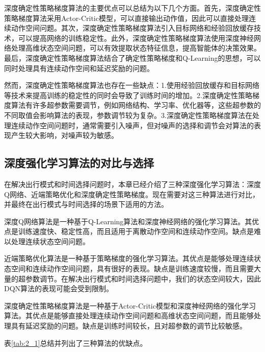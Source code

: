 深度确定性策略梯度算法的主要优点可以总结为以下几个方面。首先，深度确定性策略梯度算法采用Actor-Critic模型，可以直接输出动作值，因此可以直接处理连续动作空间问题。其次，深度确定性策略梯度算法引入目标网络和经验回放缓存技术，可以提高网络的训练稳定性。此外，深度确定性策略梯度算法使用深度神经网络处理高维状态空间问题，可以有效提取状态特征信息，提高智能体的决策效果。最后，深度确定性策略梯度算法结合了确定性策略梯度和Q-Learning的思想，可以同时处理具有连续动作空间和延迟奖励的问题。

然而，深度确定性策略梯度算法也存在一些缺点：1.使用经验回放缓存和目标网络等技术来提高训练的稳定性的同时会导致了训练时间的增加。2.深度确定性策略梯度算法有许多超参数需要调节，例如网络结构、学习率、优化器等，这些超参数的不同取值会影响算法的表现，参数调节较为复杂。3.深度确定性策略梯度算法在处理连续动作空间问题时，通常需要引入噪声，但对噪声的选择和调节会对算法的表现产生较大影响，对噪声较为敏感。

\subsection{深度强化学习算法的对比与选择}

在解决出行模式和时间选择问题时，本章已经介绍了三种深度强化学习算法：深度Q网络、近端策略优化和深度确定性策略梯度。现在需要对这三种算法进行对比，并最终在出行模式与时间选择的场景下适用的方法。

深度Q网络算法是一种基于Q-Learning算法和深度神经网络的强化学习算法。其优点是训练速度快、稳定性高，而且适用于离散动作空间和连续动作空间。缺点是难以处理连续状态空间问题。

近端策略优化算法是一种基于策略梯度的强化学习算法。其优点是能够处理连续状态空间和连续动作空间问题，具有很好的表现。缺点是训练速度较慢，而且需要大量的超参数调节。在解决出行模式和时间选择问题中，我们的状态空间较大，因此DQN算法的表现可能会受到限制。


深度确定性策略梯度算法是一种基于Actor-Critic模型和深度神经网络的强化学习算法。其优点是能够直接处理连续动作空间问题和高维状态空间问题，而且能够处理具有延迟奖励的问题。缺点是训练时间较长，且对超参数的调节比较敏感。

表\ref{tab:2_1}总结并列出了三种算法的优缺点。


